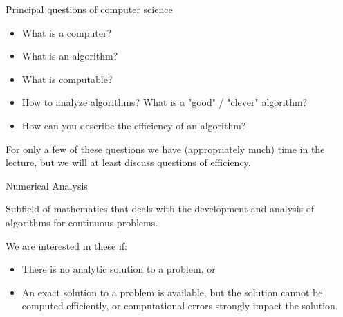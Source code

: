 \documentclass[11pt,compress,t,notes=noshow, xcolor=table]{beamer}
\begin{document}










\begin{vbframe}{Principal questions of computer science}
\begin{itemize}
  \item What is a computer?
  \item What is an algorithm?
  \item What is computable?
  \item How to analyze algorithms? What is
    a "good" / "clever" algorithm?
  \item How can you describe the efficiency of an algorithm?
\end{itemize}

\lz

For only a few of these questions we have (appropriately much) time in the lecture, but we will at least discuss questions of efficiency.

\end{vbframe}

\begin{vbframe}{Numerical Analysis}

Subfield of mathematics that deals with the development and analysis of algorithms for continuous problems.

\lz

We are interested in these if:
\begin{itemize}
\item There is no analytic solution to a problem, or
\item An exact solution to a problem is available, but the solution cannot be computed efficiently,
  or computational errors strongly impact the solution.
\end{itemize}
\end{vbframe}
\end{document}
